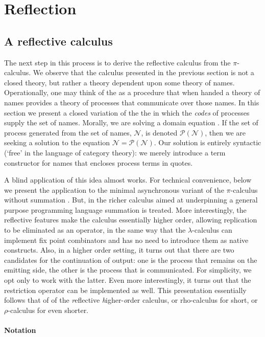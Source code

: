 \chapter{Reflection} 
\section{A reflective calculus}

The next step in this process is to derive the reflective calculus
from the $\pi$-calculus. We observe that the calculus presented in the
previous section is not a closed theory, but rather a theory dependent
upon some theory of names. Operationally, one may think of the {\pic}
as a procedure that when handed a theory of names provides a theory of
processes that communicate over those names. In this section we
present a closed variation of the the {\pic} in which the \emph{codes}
of processes supply the set of names. Morally, we are solving a domain
equation \cite{}. If the set of process generated from the set of
names, $\mathcal{N}$, is denoted $\mathcal{P(N)}$, then we are seeking
a solution to the equation $\mathcal{N} = \mathcal{P(N)}$. Our
solution is entirely syntactic (`free' in the language of category
theory): we merely introduce a term constructor for names that
encloses process terms in quotes.

A blind application of this idea almost works. For technical
convenience, below we present the application to the minimal
asynchronous variant of the $\pi$-calculus without summation
\cite{}. But, in the richer calculus aimed at underpinning a general
purpose programming language summation is treated. More interestingly,
the reflective features make the calculus essentially higher order,
allowing replication to be eliminated as an operator, in the same way
that the $\lambda$-calculus can implement fix point combinators and
has no need to introduce them as native constructs. Also, in a higher
order setting, it turns out that there are two candidates for the
continuation of output: one is the process that remains on the
emitting side, the other is the process that is communicated. For
simplicity, we opt only to work with the latter. Even more
interestingly, it turns out that the restriction operator can be
implemented as well. This presentation essentially follows that of
\cite{meredith2005rho} of the \emph{r}eflective
\emph{h}igher-\emph{o}rder calculus, or rho-calculus for short, or
$\rho$-calculus for even shorter.

\subsubsection{Notation}

